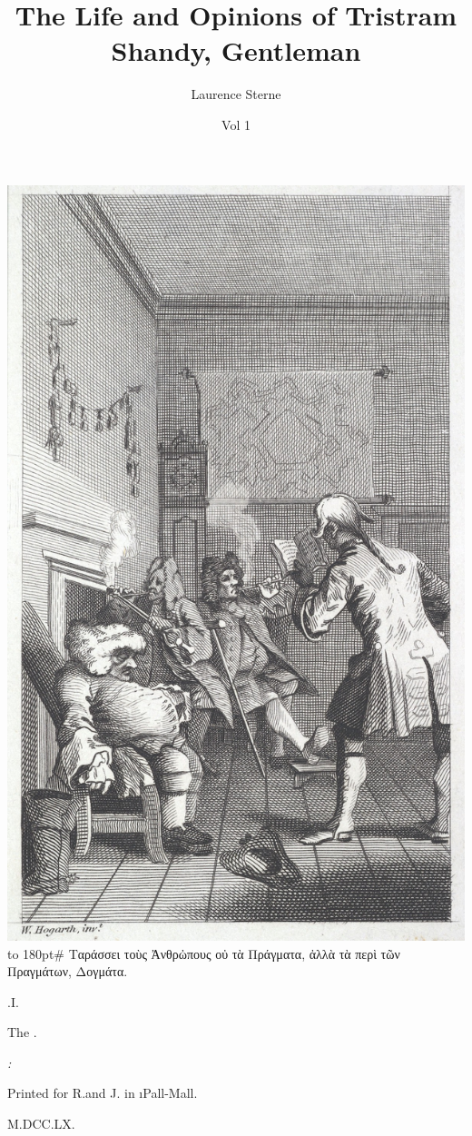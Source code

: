 \documentclass[twoside]{article}
\title{The Life and Opinions of Tristram Shandy, Gentleman}
\author{Laurence Sterne}
\date{Vol 1}
\begin{document}
\pagestyle{empty}
\null\newpage\noindent
\includegraphics[width=\textwidth]{hogarth-front-1}
\newpage
\vbox{\openup 10pt}
\vfill
\vbox{\openup -2pt\halign to 180pt{\footnotesize #\cr
\quad Ταράσσει τοὺς Ἀνθρὠπους οὐ τὰ Πράγματα,\cr
ἀλλὰ τὰ περὶ τῶν Πραγμάτων, Δογμάτα.\hfill\cr}}
\vfill
\centerline{.\quad I.}
\smallskip
\centerline{The\kern 5pt .}
\vfill
\centerline{\itshape{}:}
\centerline{\smaller Printed for R.\@ and J.\@ {} in \i{Pall-Mall}.}
\centerline{M.DCC.LX.}
\end{document}
